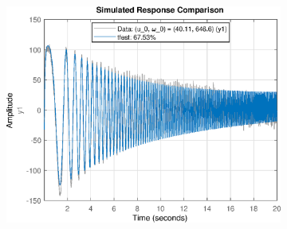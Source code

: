 \begin{figure}[H]
\begin{minipage}{0.32\textwidth}
\begin{figure}[H]
       \end{figure}
    \end{minipage}
    \begin{minipage}{0.32\textwidth}
       \begin{figure}[H]
            \includegraphics[width = \textwidth]{./figs/small_perturbation/time_Compare_1500.eps}
       \end{figure}
    \end{minipage}
\end{figure}
